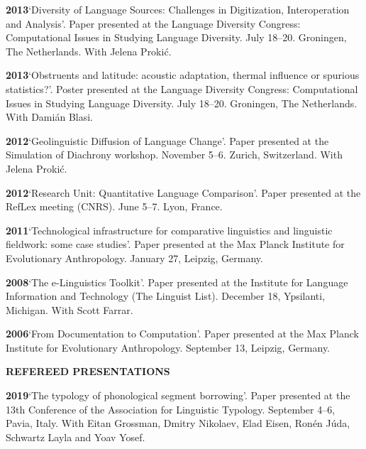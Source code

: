\documentclass[11pt]{article}
\newcommand{\hangpara}{
 \setlength{\parindent}{0in} %
 \hangindent=0.42in %
}
\begin{document}
\vskip 6pt
\hangpara
{\bf 2013}\hspace{1ex}`Diversity of Language Sources: Challenges in Digitization, Interoperation and Analysis'. Paper presented at the Language Diversity Congress: Computational Issues in Studying Language Diversity. July 18--20. Groningen, The Netherlands. With Jelena Proki{\'c}.

\vskip 6pt
\hangpara
{\bf 2013}\hspace{1ex}`Obstruents and latitude: acoustic adaptation, thermal influence or spurious statistics?'. Poster presented at the Language Diversity Congress: Computational Issues in Studying Language Diversity. July 18--20. Groningen, The Netherlands. With Dami{\'a}n Blasi.

\vskip 6pt
\hangpara
{\bf 2012}\hspace{1ex}`Geolinguistic Diffusion of Language Change'. Paper presented at the Simulation of Diachrony workshop. November 5--6. Zurich, Switzerland. With Jelena Proki{\'c}.

\vskip 6pt
\hangpara
{\bf 2012}\hspace{1ex}`Research Unit: Quantitative Language Comparison'. Paper presented at the RefLex meeting (CNRS). June 5--7. Lyon, France. 

\vskip 6pt
\hangpara
{\bf 2011}\hspace{1ex}`Technological infrastructure for comparative linguistics and linguistic fieldwork: some case studies'. Paper presented at the Max Planck Institute for Evolutionary Anthropology. January 27, Leipzig, Germany. 

\vskip 6pt
\hangpara
{\bf 2008}\hspace{1ex}`The e-Linguistics Toolkit'. Paper presented at the Institute for Language Information and Technology (The Linguist List). December 18, Ypsilanti, Michigan. With Scott Farrar.

\vskip 6pt
\hangpara
{\bf 2006}\hspace{1ex}`From Documentation to Computation'. Paper presented at the Max Planck Institute for Evolutionary Anthropology. September 13, Leipzig, Germany.


\vskip 20pt
\begin{flushleft}
{\bf REFEREED PRESENTATIONS}
\end{flushleft}

\hangpara
{\bf 2019}\hspace{1ex}`The typology of phonological segment borrowing'. Paper presented at the 
13th Conference of the Association for Linguistic Typology. September 4--6, Pavia, Italy. With Eitan Grossman, Dmitry Nikolaev, Elad Eisen, Ronén Júda, Schwartz Layla and Yoav Yosef.
\end{document}
